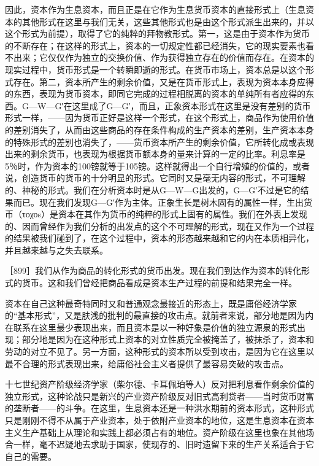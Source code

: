 因此，资本作为生息资本，而且正是在它作为生息货币资本的直接形式上（生息资本的其他形式在这里与我们无关，这些其他形式也是由这个形式派生出来的，并以这个形式为前提），取得了它的纯粹的拜物教形式。第一，这是由于资本作为货币的不断存在；在这样的形式上，资本的一切规定性都已经消失，它的现实要素也看不出来；它仅仅作为独立的交换价值、作为获得独立存在的价值而存在。在资本的现实过程中，货币形式是一个转瞬即逝的形式。在货币市场上，资本总是以这个形式存在。第二，资本所产生的剩余价值，又是在货币形式上，表现为资本本身应得的东西，表现为货币资本，即同它完成的过程相脱离的资本的单纯所有者应得的东西。G—W—G′在这里成了G—G′，而且，正象资本形式在这里是没有差别的货币形式一样，——因为货币正好是这样一个形式，在这个形式上，商品作为使用价值的差别消失了，从而由这些商品的存在条件构成的生产资本的差别，生产资本本身的特殊形式的差别也消失了，——货币资本所产生的剩余价值，它所转化成或表现出来的剩余货币，也表现为根据货币额本身的量来计算的一定的比率。利息率是5％时，作为资本的100镑就等于105镑。这样就得出一个自行增殖的价值的，或者说，创造货币的货币的十分明显的形式。它同时又是毫无内容的形式，不可理解的、神秘的形式。我们在分析资本时是从G—W—G出发的，G—G′不过是它的结果而已。现在我们发现G—G′作为主体。正象生长是树木固有的属性一样，生出货币（τοχοs）是资本在其作为货币的纯粹的形式上固有的属性。我们在外表上发现的、因而曾经作为我们分析的出发点的这个不可理解的形式，现在又作为一个过程的结果被我们碰到了，在这个过程中，资本的形态越来越和它的内在本质相异化，并且越来越与之失去联系。

［899］我们从作为商品的转化形式的货币出发。现在我们到达作为资本的转化形式的货币。这和我们曾经把商品看成是资本生产过程的前提和结果完全一样。

资本在自己这种最奇特同时又和普通观念最接近的形态上，既是庸俗经济学家的“基本形式”，又是肤浅的批判的最直接的攻击点。就前者来说，部分地是因为内在联系在这里最少表现出来，而且资本是以一种好象是价值的独立源泉的形式出现；部分地是因为在这种形式上资本的对立性质完全被掩盖了，被抹杀了，资本和劳动的对立不见了。另一方面，这种形式的资本所以受到攻击，是因为它在这里以最不合理的形式表现出来，给庸俗社会主义者提供了最容易突破的攻击点。

十七世纪资产阶级经济学家（柴尔德、卡耳佩珀等人）反对把利息看作剩余价值的独立形式，这种论战只是新兴的产业资产阶级反对旧式高利贷者——当时货币财富的垄断者——的斗争。在这里，生息资本还是一种洪水期前的资本形式，这种形式只是刚刚不得不从属于产业资本，处于依附产业资本的地位，这是生息资本在资本主义生产基础上从理论和实践上都必须占有的地位。资产阶级在这里也象在其他场合一样，毫不迟疑地去求助于国家，使现存的、旧时遗留下来的生产关系适合于它自己的需要。


